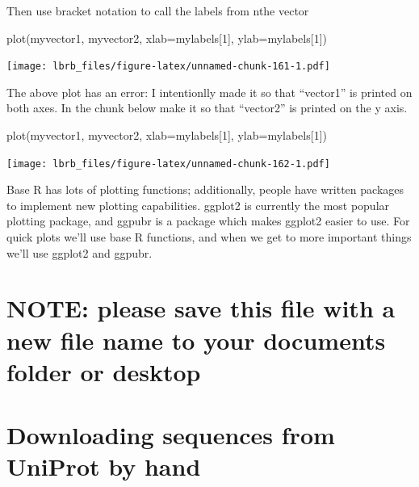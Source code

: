 \documentclass[
]{book}
\newenvironment{Shaded}{\begin{snugshade}}{\end{snugshade}}
\newcommand{\AttributeTok}[1]{\textcolor[rgb]{0.77,0.63,0.00}{#1}}
\newcommand{\DecValTok}[1]{\textcolor[rgb]{0.00,0.00,0.81}{#1}}
\newcommand{\FunctionTok}[1]{\textcolor[rgb]{0.00,0.00,0.00}{#1}}
\newcommand{\NormalTok}[1]{#1}
\begin{document}
Then use bracket notation to call the labels from nthe vector

\begin{Shaded}
\begin{Highlighting}[]
\FunctionTok{plot}\NormalTok{(myvector1, }
\NormalTok{     myvector2, }
     \AttributeTok{xlab=}\NormalTok{mylabels[}\DecValTok{1}\NormalTok{],}
     \AttributeTok{ylab=}\NormalTok{mylabels[}\DecValTok{1}\NormalTok{])}
\end{Highlighting}
\end{Shaded}

\texttt{[image: lbrb\_files/figure-latex/unnamed-chunk-161-1.pdf]}

The above plot has an error: I intentionlly made it so that ``vector1'' is printed on both axes. In the chunk below make it so that ``vector2'' is printed on the y axis.

\begin{Shaded}
\begin{Highlighting}[]
\FunctionTok{plot}\NormalTok{(myvector1, }
\NormalTok{     myvector2, }
     \AttributeTok{xlab=}\NormalTok{mylabels[}\DecValTok{1}\NormalTok{],}
     \AttributeTok{ylab=}\NormalTok{mylabels[}\DecValTok{1}\NormalTok{])}
\end{Highlighting}
\end{Shaded}

\texttt{[image: lbrb\_files/figure-latex/unnamed-chunk-162-1.pdf]}

Base R has lots of plotting functions; additionally, people have written packages to implement new plotting capabilities. ggplot2 is currently the most popular plotting package, and ggpubr is a package which makes ggplot2 easier to use. For quick plots we'll use base R functions, and when we get to more important things we'll use ggplot2 and ggpubr.

\hypertarget{note-please-save-this-file-with-a-new-file-name-to-your-documents-folder-or-desktop}{%
\chapter{NOTE: please save this file with a new file name to your documents folder or desktop}\label{note-please-save-this-file-with-a-new-file-name-to-your-documents-folder-or-desktop}}

\hypertarget{downloading-sequences-from-uniprot-by-hand}{%
\chapter{Downloading sequences from UniProt by hand}\label{downloading-sequences-from-uniprot-by-hand}}
\end{document}
